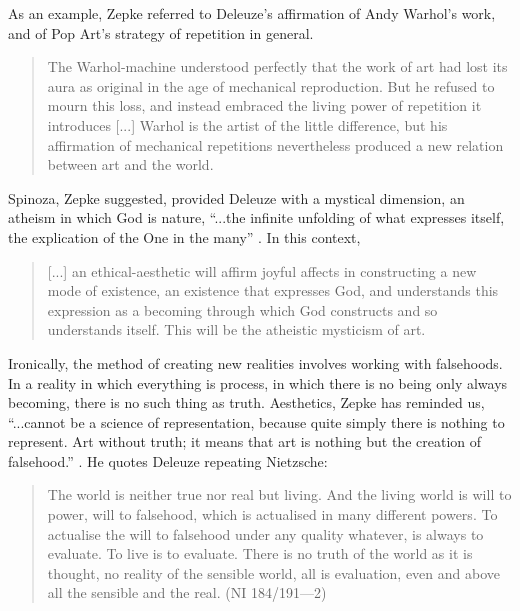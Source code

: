         As an example, Zepke referred to Deleuze's affirmation of Andy Warhol's work, and of Pop Art's strategy of repetition in general. 

        \begin{quote}
            The Warhol-machine understood perfectly that the work of art had lost its aura as original in the age of mechanical reproduction. But he refused to mourn this loss, and instead embraced the living power of repetition it introduces [...] Warhol is the artist of the little difference, but his affirmation of mechanical repetitions nevertheless produced a new relation between art and the world. \citep[p.35-36]{ZepkeArtAsAbstrctMchn2005}
        \end{quote}

        Spinoza, Zepke suggested, provided Deleuze with a mystical dimension, an atheism in which God is nature, “...the infinite unfolding of what expresses itself, the explication of the One in the many” \citep[p.42]{ZepkeArtAsAbstrctMchn2005}. In this context,

        \begin{quote}
            [...] an ethical-aesthetic will affirm joyful affects in constructing a new mode of existence, an existence that expresses God, and understands this expression as a becoming through which God constructs and so understands itself. This will be the atheistic mysticism of art. \citep[p.52]{ZepkeArtAsAbstrctMchn2005}
        \end{quote}

        Ironically, the method of creating new realities involves working with falsehoods. In a reality in which everything is process, in which there is no being only always becoming, there is no such thing as truth.
        Aesthetics, Zepke has reminded us, “...cannot be a science of representation, because quite simply there is nothing to represent. Art without truth; it means that art is nothing but the creation of falsehood.” \citep[p.19]{ZepkeArtAsAbstrctMchn2005}. He quotes Deleuze repeating Nietzsche:
        
        \begin{quote}
            The world is neither true nor real but living. And the living world is will to power, will to falsehood, which is actualised in many different powers. To actualise the will to falsehood under any quality whatever, is always to evaluate. To live is to evaluate. There is no truth of the world as it is thought, no reality of the sensible world, all is evaluation, even and above all the sensible and the real. (NI 184/191—2) \citep[p.19]{ZepkeArtAsAbstrctMchn2005}
        \end{quote}


